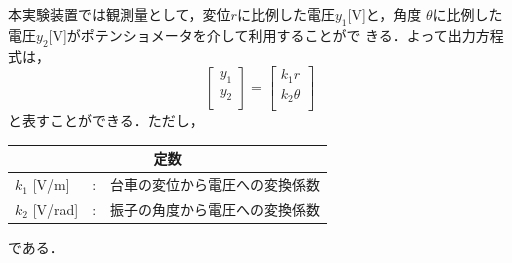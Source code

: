 本実験装置では観測量として，変位$r$に比例した電圧$y_1$[V]と，角度
$\theta$に比例した電圧$y_2$[V]がポテンショメータを介して利用することがで
きる．よって出力方程式は，
\begin{equation}
 \left[
  \begin{array}{c}
   y_1 \\
   y_2 \\
  \end{array}
 \right] =
 \left[
  \begin{array}{c}
   k_1 r \\
   k_2 \theta \\
  \end{array}
 \right]
 \label{eq:output}
\end{equation}
と表すことができる．ただし，
\begin{center}
 \begin{tabular}{lcl}\hline
  \multicolumn{3}{c}{\bf 定数} \\ \hline
  $k_1$ [V/m] & : & 台車の変位から電圧への変換係数 \\
  $k_2$ [V/rad] & : & 振子の角度から電圧への変換係数 \\ \hline
 \end{tabular}
\end{center}
である．

